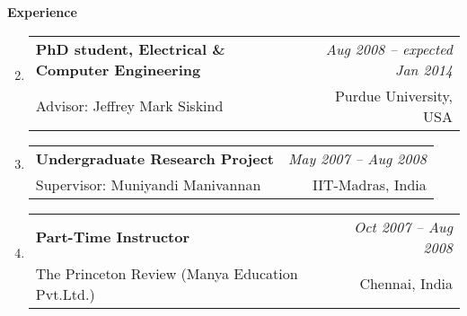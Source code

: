 \documentclass[10pt]{article}
\makeatletter
\newenvironment{benumerate}[2]{
    \let\oldItem\item
    \def\item{\addtocounter{enumi}{-2}\oldItem}
    \begin{enumerate}[#2]
    \setcounter{enumi}{#1}
    \addtocounter{enumi}{1}}
  {\end{enumerate}}
\newenvironment{position}[4]
{%
\item
  \begin{tabular*}{6.5in}{l@{\extracolsep{\fill}}r}
    \textbf{#1} & \textit{#2} \\ #3 & \small{#4} \\
  \end{tabular*}
  }
  { %
}
\newenvironment{region}[3]{%
  \vspace*{0.5ex}
  {\large \textbf{#1}}
  \begin{benumerate}{#3}{\color{RoyalBlue}#2}}
  {\end{benumerate}}
\newenvironment{nonumregion}[1]{%
\begin{region}{#1}{}{1}}
{\end{region}}
\makeatother
\begin{document}
\vspace*{-1ex}
\begin{nonumregion} {Experience}
  \begin{position} {PhD student, Electrical \& Computer Engineering}
    {Aug 2008 -- expected Jan 2014}
    {Advisor: Jeffrey Mark Siskind}
    {Purdue University, USA}
  \end{position}
  \begin{position} {Undergraduate Research Project}
    {May 2007 -- Aug 2008}
    {Supervisor: Muniyandi Manivannan}
    {IIT-Madras, India}
  \end{position}
  \begin{position} {Part-Time Instructor}
    {Oct 2007 -- Aug 2008}
    {The Princeton Review (Manya Education Pvt.Ltd.)}
    {Chennai, India}

\end{position}
\end{nonumregion}
\end{document}
